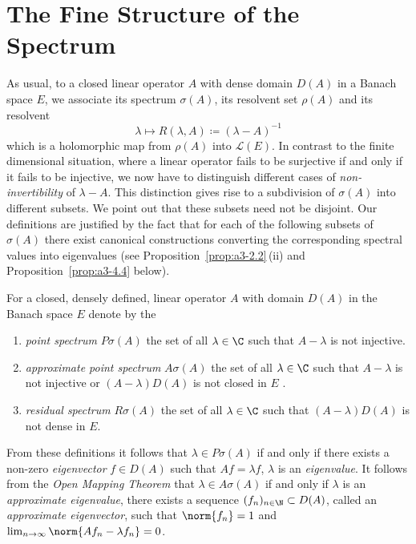 \section{The Fine Structure of the Spectrum}\label{sec:a3-2}%
As usual, to a closed linear operator $A$ with dense domain $D(A)$ in a Banach space $E$, we associate its spectrum $\sigma(A)$, its resolvent set
$\rho(A)$ and its resolvent 
\[
    \lambda \mapsto R(\lambda,A) \coloneqq (\lambda - A)^{-1}
\]
which is a holomorphic map from $\rho(A)$ into $\mathcal{L}(E)$.
In contrast to the finite dimensional situation, where a linear operator fails to be surjective if and only if it fails to be injective, we now have to distinguish different cases of \emph{non-invertibility} of\/ $\lambda - A$.
This distinction gives rise to a subdivision of\/ $\sigma(A)$ into different subsets.
We point out that these subsets need not be disjoint. Our definitions are
justified by the fact that for each of the following subsets of\/ $\sigma(A)$ there exist canonical constructions converting the corresponding spectral values into eigenvalues (see Proposition~\ref{prop:a3-2.2}\,(ii) and Proposition~\ref{prop:a3-4.4} below).
\begin{definition}\label{def:a3-2.1}
For a closed, densely defined, linear operator $A$ with domain $D(A)$ in the Banach space $E$ denote by the
\begin{enumerate}[\upshape (i)]
\item 
\emph{point spectrum} $P\sigma(A)$ the set of all $\lambda \in \C$ such that 
$A - \lambda$ is not injective.

\item 
\emph{approximate point spectrum}
$A\sigma(A)$ the set of all $\lambda \in \C$ such that $A - \lambda$ is not injective or $(A - \lambda)D(A)$ is not closed in $E$ .

\item 
\emph{residual spectrum} $R\sigma(A)$ the set of all $\lambda \in \C$ such that $(A - \lambda)D(A)$ is not dense in $E$.
\end{enumerate}
\end{definition}
From these definitions it follows that $\lambda \in P\sigma(A)$ if and only if there exists a non-zero \emph{eigenvector}%
$f \in D(A)$ such that $Af = \lambda f$, \ie $\lambda$ is an \emph{eigenvalue}.
It follows from the \emph{Open Mapping Theorem} that $\lambda \in A\sigma(A)$ if and only if\/ $\lambda$ is an \emph{approximate eigenvalue}, 
\ie there exists a sequence $(f_{n})_{n \in \N} \subset D(A)$, called an \emph{approximate eigenvector}, 
such that $\norm{f_{n}} = 1$ and $ \lim_{n \to \infty} \norm{Af_{n} - \lambda f_{n}} = 0$.

